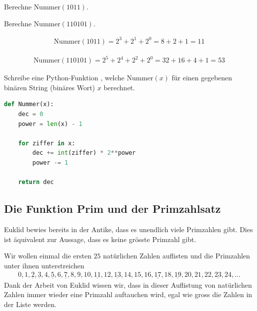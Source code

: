 \begin{myexercise}
	\begin{aenum}
		\item Berechne $\text{Nummer}(1011)$.
		\item Berechne $\text{Nummer}(110101)$.
	\end{aenum}
	\begin{myanswer}
		\begin{aenum}
			\item \begin{align*}
				\text{Nummer}(1011) = 2^3 + 2^1 + 2^0 = 8 + 2 + 1 = 11
			\end{align*}
			\item \begin{align*}
				\text{Nummer}(110101) = 2^5 + 2^4 + 2^2 + 2^0 = 32 + 16 + 4 + 1 = 53
			\end{align*}
		\end{aenum}
	\end{myanswer}
\end{myexercise}


\begin{mychallenge}
	Schreibe eine Python-Funktion , welche $\text{Nummer}(x)$ für einen gegebenen binären String (binäres Wort) $x$ berechnet.
	\begin{myanswer}
		\begin{lstlisting}[language=Python,caption=Nummer,numbers=none]
def Nummer(x):
    dec = 0
    power = len(x) - 1

    for ziffer in x:
        dec += int(ziffer) * 2**power
        power -= 1

    return dec
\end{lstlisting}
	\end{myanswer}
\end{mychallenge}

\subsection{Die Funktion Prim und der Primzahlsatz}
Euklid bewies bereits in der Antike, dass es unendlich viele Primzahlen gibt.
Dies ist äquivalent zur Aussage, dass es keine grösste Primzahl gibt.

Wir wollen einmal die ersten $25$ natürlichen Zahlen auflisten und die Primzahlen unter ihnen unterstreichen
\begin{align*}
	0, 1, \underline{2}, \underline{3}, 4, \underline{5}, 6, \underline{7}, 8, 9, 10, \underline{11}, 12, \underline{13}, 14, 15, 16, \underline{17}, 18, \underline{19}, 20, 21, 22, \underline{23}, 24, \ldots
\end{align*}
Dank der Arbeit von Euklid wissen wir, dass in dieser Auflistung von natürlichen Zahlen immer wieder eine Primzahl auftauchen wird, egal wie gross die Zahlen in der Liste werden.

